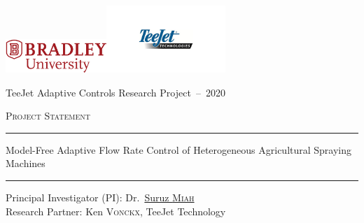 \documentclass[12pt]{article}
\title{\proposalTitle}
\def\grantName{TeeJet Adaptive Controls Research Project~--~2020}
\def\proposalTitle{Model-Free Adaptive Flow Rate Control of Heterogeneous Agricultural
  Spraying Machines}
\newcommand{\midskip}[0]{\vspace{3mm}}
\begin{document}
\centerline{\href{http://www.bradley.edu}{\includegraphics[height=0.5in]{figs/logoBU1-Print}}\hfill\href{https://www.teejet.com/}{\includegraphics[height=1.0in]{figs/TeeJet-Logo}}}

\begin{center}
\vspace*{1.0cm}
{\LARGE \grantName}


\vspace*{0.25cm}

{\LARGE \textsc{Project Statement}}

\vspace*{0.5cm}

\vspace*{1.5cm}
{\color{BrickRed}
\hrule height 1.5pt
\midskip
}
{\LARGE 
\proposalTitle
}
\midskip
{\color{BrickRed}
\hrule height 1.5pt
\midskip
}
\vspace*{0.01cm}
\begin{flushright}
{\large
 Principal Investigator (PI):  Dr.~\href{http://personalpages.bradley.edu/~smiah}{Suruz \textsc{Miah}}\\
 Research Partner: Ken \textsc{Vonckx}, TeeJet Technology
}
\end{flushright}


\end{center}
\end{document}
